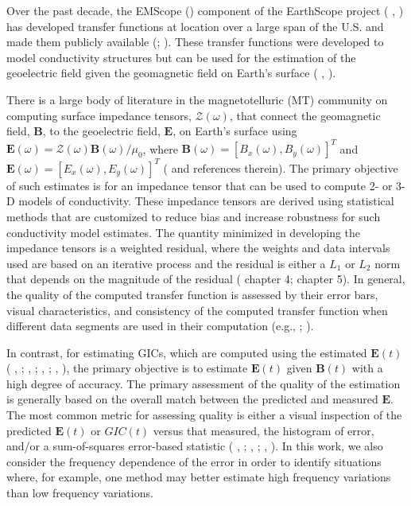 \documentclass[linenumbers,draft]{agujournal}
\newcommand{\citeay}[1]{%
\citeauthor{#1}, \citeyear{#1}%
}
\begin{document}
Over the past decade, the EMScope (\cite{Schultz2009}) component of the EarthScope project (\citeay{Meltzer2003}) has developed transfer functions at location over a large span of the U.S. and made them publicly available (\cite{Kelbert2011}; \cite{Schultz2016}).  These transfer functions were developed to model conductivity structures but can be used for the estimation of the geoelectric field given the geomagnetic field on Earth's surface (\citeay{Bedrosian2015}).

There is a large body of literature in the magnetotelluric (MT) community on computing surface impedance tensors, $\mathcal{Z}(\omega)$, that connect the geomagnetic field, $\mathbf{B}$, to the geoelectric field, $\mathbf{E}$, on Earth's surface using $\mathbf{E}(\omega) = \mathcal{Z}(\omega)\mathbf{B}(\omega)/\mu_0$, where $\mathbf{B}(\omega) = [B_x(\omega),B_y(\omega)]^T$ and $\mathbf{E}(\omega) = [E_x(\omega),E_y(\omega)]^T$ (\cite{Chave2012} and references therein).  The primary objective of such estimates is for an impedance tensor that can be used to compute 2- or 3-D models of conductivity. These impedance tensors are derived using statistical methods that are customized to reduce bias and increase robustness for such conductivity model estimates.  The quantity minimized in developing the impedance tensors is a weighted residual, where the weights and data intervals used are based on an iterative process and the residual is either a $L_1$ or $L_2$ norm that depends on the magnitude of the residual (\cite{Simpson2005} chapter 4; \cite{Chave2012} chapter 5).  In general, the quality of the computed transfer function is assessed by their error bars, visual characteristics, and consistency of the computed transfer function when different data segments are used in their computation (e.g., \cite{Jones1989}; \cite{Fujii2015}).

In contrast, for estimating GICs, which are computed using the estimated $\mathbf{E}(t)$ (\citeay{Lehtinen1985}; \citeay{Pulkkinen2010}; \citeay{Viljanen2012}; \citeay{NERC2015}), the primary objective is to estimate $\mathbf{E}(t)$ given $\mathbf{B}(t)$ with a high degree of accuracy.  The primary assessment of the quality of the estimation is generally based on the overall match between the predicted and measured $\mathbf{E}$.  The most common metric for assessing quality is either a visual inspection of the predicted $\mathbf{E}(t)$ or $GIC(t)$ versus that measured, the histogram of error, and/or a sum-of-squares error-based statistic  (\citeay{McKay2003}; \citeay{Pulkkinen2010}; \citeay{Love2014}).  In this work, we also consider the frequency dependence of the error in order to identify situations where, for example, one method may better estimate high frequency variations than low frequency variations.
\end{document}
